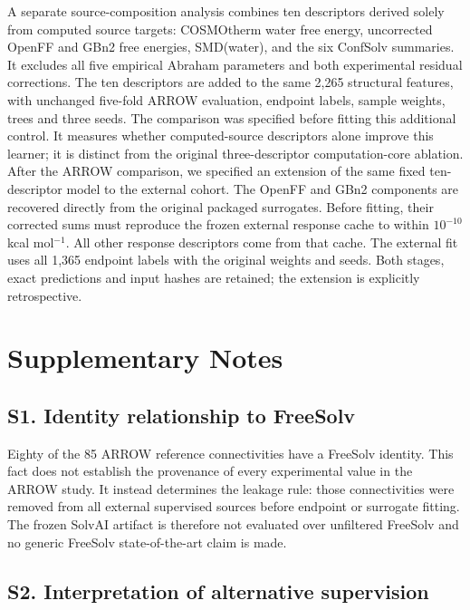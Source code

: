 A separate source-composition analysis combines ten descriptors derived
solely from computed source targets: COSMOtherm water free energy, uncorrected OpenFF
and GBn2 free energies, SMD(water), and the six ConfSolv summaries. It excludes all
five empirical Abraham parameters and both experimental residual corrections.
The ten descriptors are added to the same 2,265 structural features, with unchanged
five-fold ARROW evaluation, endpoint labels, sample weights, trees and three seeds.
The comparison was specified before fitting this additional control. It measures
whether computed-source descriptors alone improve this learner; it is distinct from
the original three-descriptor computation-core ablation. After the ARROW comparison,
we specified an extension of the same fixed ten-descriptor model to the external
cohort. The OpenFF and GBn2 components are recovered directly from the original
packaged surrogates. Before fitting, their corrected sums must reproduce the frozen
external response cache to within $10^{-10}$ kcal mol$^{-1}$. All other response
descriptors come from that cache. The external fit uses all 1,365 endpoint labels
with the original weights and seeds. Both stages, exact predictions and input hashes
are retained; the extension is explicitly retrospective.




\section*{Supplementary Notes}

\subsection*{S1. Identity relationship to FreeSolv}

Eighty of the 85 ARROW reference connectivities have a FreeSolv identity. This fact
does not establish the provenance of every experimental value in the ARROW study.
It instead determines the leakage rule: those connectivities were removed from all
external supervised sources before endpoint or surrogate fitting. The frozen SolvAI
artifact is therefore not evaluated over unfiltered FreeSolv and no generic FreeSolv
state-of-the-art claim is made.

\subsection*{S2. Interpretation of alternative supervision}

